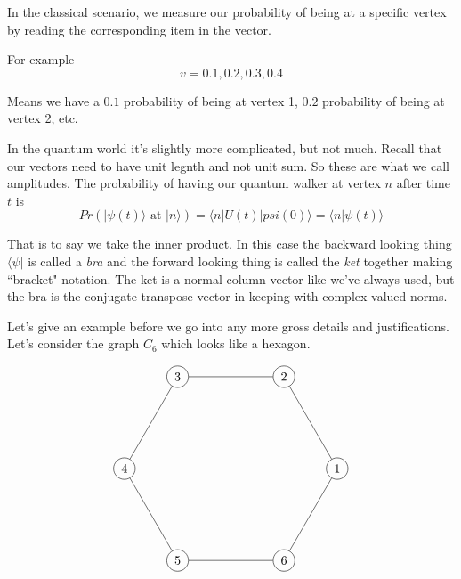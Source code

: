 \documentclass{article}
\theoremstyle{definition}
\theoremstyle{remark}
\newcommand{\ket}[1]{|#1\rangle}
\newcommand{\bra}[1]{\langle #1 |}
\begin{document}
In the classical scenario, we measure our probability of being at a specific vertex by reading the corresponding item in the vector.

For example
\[
v = 0.1, 0.2, 0.3, 0.4
\]

Means we have a $0.1$ probability of being at vertex 1, $0.2$ probability of being at vertex 2, etc.

In the quantum world it's slightly more complicated, but not much.  Recall that our vectors need to have unit legnth and not unit sum.  So these are what we call amplitudes. The probability of having our quantum walker at vertex $n$ after time $t$ is 
\[
Pr(\ket{\psi(t)} \text{ at } \ket{n}) = \bra{n} U(t) \ket{psi(0)} = \langle n | \psi(t) \rangle
\]

That is to say we take the inner product.  In this case the backward looking thing $\bra{\psi}$ is called a \emph{bra} and the forward looking thing is called the \emph{ket} together making ``bracket" notation.  The ket is a normal column vector like we've always used, but the bra is the conjugate transpose vector in keeping with complex valued norms.


Let's give an example before we go into any more gross details and justifications.  Let's consider the graph $C_6$ which looks like a hexagon.

\[
\begin{tikzpicture}
\node[circle,draw] (1) at (3,0){1};
\node[circle,draw] (2) at (1.5,2.6){2};
\node[circle,draw] (3) at (-1.5,2.6){3};
\node[circle,draw] (4) at (-3,-0){4};
\node[circle,draw] (5) at (-1.5,-2.6){5};
\node[circle,draw] (6) at (1.5,-2.6){6};
\foreach \from/\to in {1/2,2/3,3/4,4/5, 5/6, 6/1}
\draw (\from) -- (\to);
\end{tikzpicture}
\]
\end{document}
